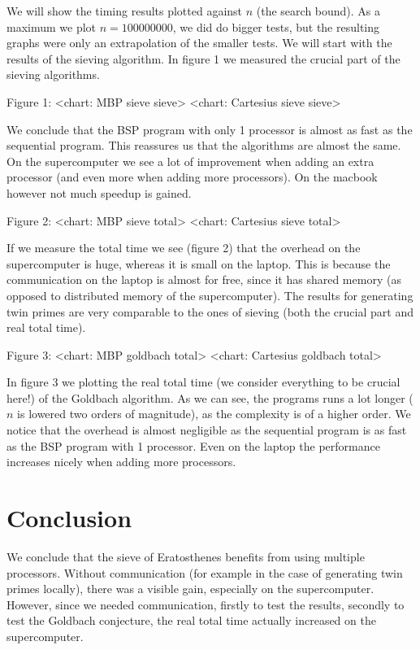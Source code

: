 \documentclass{article}
\begin{document}
We will show the timing results plotted against $n$ (the search bound). As a maximum we plot $n = 100 000 000$, we did do bigger tests, but the resulting graphs were only an extrapolation of the smaller tests. We will start with the results of the sieving algorithm. In figure 1 we measured the crucial part of the sieving algorithms.

Figure 1: <chart: MBP sieve sieve> <chart: Cartesius sieve sieve>

We conclude that the BSP program with only 1 processor is almost as fast as the sequential program. This reassures us that the algorithms are almost the same. On the supercomputer we see a lot of improvement when adding an extra processor (and even more when adding more processors). On the macbook however not much speedup is gained.

Figure 2: <chart: MBP sieve total> <chart: Cartesius sieve total>

If we measure the total time we see (figure 2) that the overhead on the supercomputer is huge, whereas it is small on the laptop. This is because the communication on the laptop is almost for free, since it has shared memory (as opposed to distributed memory of the supercomputer). The results for generating twin primes are very comparable to the ones of sieving (both the crucial part and real total time).

Figure 3: <chart: MBP goldbach total> <chart: Cartesius goldbach total>

In figure 3 we plotting the real total time (we consider everything to be crucial here!) of the Goldbach algorithm. As we can see, the programs runs a lot longer ($n$ is lowered two orders of magnitude), as the complexity is of a higher order. We notice that the overhead is almost negligible as the sequential program is as fast as the BSP program with 1 processor. Even on the laptop the performance increases nicely when adding more processors.


\section{Conclusion}
We conclude that the sieve of Eratosthenes benefits from using multiple processors. Without communication (for example in the case of generating twin primes locally), there was a visible gain, especially on the supercomputer. However, since we needed communication, firstly to test the results, secondly to test the Goldbach conjecture, the real total time actually increased on the supercomputer.
\end{document}
